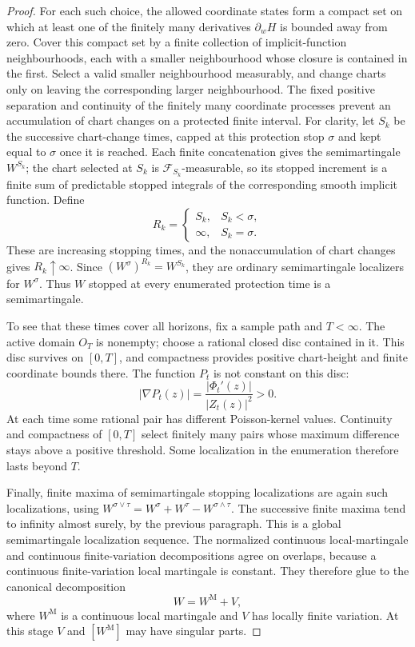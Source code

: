 \begin{proof}
For each such choice, the allowed coordinate states form a compact
set on which at least one of the finitely many derivatives
$\partial_wH$ is bounded away from zero.  Cover this compact set by a
finite collection of implicit-function neighbourhoods, each with a
smaller neighbourhood whose closure is contained in the first.
Select a valid smaller neighbourhood measurably, and change charts
only on leaving the corresponding larger neighbourhood.  The fixed
positive separation and continuity of the finitely many coordinate
processes prevent an accumulation of chart changes on a protected
finite interval.  For clarity, let $S_k$ be the successive chart-change times, capped at
this protection stop $\sigma$ and kept equal to $\sigma$ once it is
reached.  Each finite concatenation gives the semimartingale
$W^{S_k}$; the chart selected at $S_k$ is $\mathcal F_{S_k}$-measurable,
so its stopped increment is a finite sum of predictable stopped
integrals of the corresponding smooth implicit function.  Define
\[
 R_k=\begin{cases}S_k,&S_k<\sigma,\\
                  \infty,&S_k=\sigma.
       \end{cases}
\]
These are increasing stopping times, and the nonaccumulation of chart
changes gives $R_k\uparrow\infty$.  Since
$(W^\sigma)^{R_k}=W^{S_k}$, they are ordinary semimartingale localizers
for $W^\sigma$.  Thus $W$ stopped at every enumerated protection time
is a semimartingale.

To see that these times cover all horizons, fix a sample path and
$T<\infty$.  The active domain $O_T$ is nonempty; choose a rational
closed disc contained in it.  This disc survives on $[0,T]$, and
compactness provides positive chart-height and finite coordinate
bounds there.  The function $P_t$ is not constant on this disc:
\[
 |\nabla P_t(z)|=\frac{|\Phi_t'(z)|}{|Z_t(z)|^2}>0.
\]
At each time some rational pair has different Poisson-kernel values.
Continuity and compactness of $[0,T]$ select finitely many pairs whose
maximum difference stays above a positive threshold.  Some
localization in the enumeration therefore lasts beyond $T$.

Finally, finite maxima of semimartingale stopping localizations are
again such localizations, using
$W^{\sigma\vee\tau}=W^\sigma+W^\tau-W^{\sigma\wedge\tau}$.
The successive finite maxima tend to infinity almost surely, by the
previous paragraph.  This is a global semimartingale localization
sequence.  The normalized continuous local-martingale and continuous
finite-variation decompositions agree on overlaps, because a continuous
finite-variation local martingale is constant.  They therefore glue
to the canonical decomposition
\begin{equation}
 W=W^{\mathrm M}+V,
 \label{cal:decomposition}
\end{equation}
where $W^{\mathrm M}$ is a continuous local martingale and $V$ has locally finite
variation. At this stage $V$ and $[W^{\mathrm M}]$ may have singular parts.
\end{proof}

